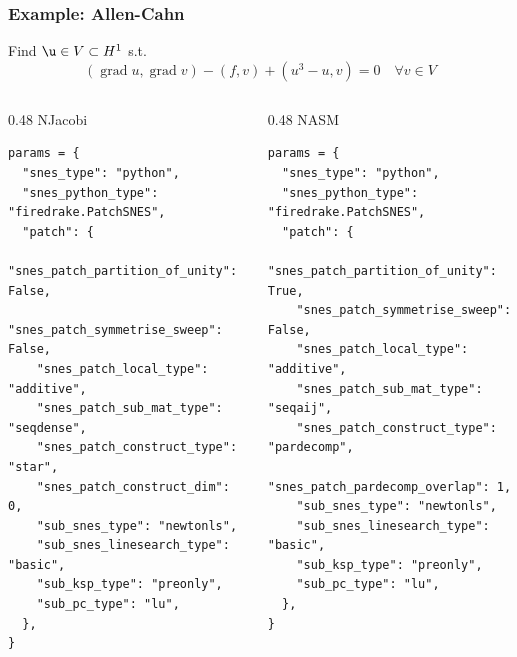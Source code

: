 \documentclass[presentation,aspectratio=43,10pt]{beamer}
\DeclareMathOperator{\grad}{grad}
\begin{document}
\begin{frame}[fragile]
  \frametitle{Example: Allen-Cahn}
  Find $\u \in V \subset H^1$ s.t.
  \begin{equation*}
    (\grad u, \grad v) - (f, v) + (u^3 - u, v) = 0 \quad \forall v
    \in V
  \end{equation*}
  \begin{columns}[T]
    \hspace{0.5em}
    \begin{column}{0.48\pagewidth}
      NJacobi
\begin{verbatim}
params = {
  "snes_type": "python",
  "snes_python_type": "firedrake.PatchSNES",
  "patch": {
    "snes_patch_partition_of_unity": False,
    "snes_patch_symmetrise_sweep": False,
    "snes_patch_local_type": "additive",
    "snes_patch_sub_mat_type": "seqdense",
    "snes_patch_construct_type": "star",
    "snes_patch_construct_dim": 0,
    "sub_snes_type": "newtonls",
    "sub_snes_linesearch_type": "basic",
    "sub_ksp_type": "preonly",
    "sub_pc_type": "lu",
  },
}
\end{verbatim}
    \end{column}
    \hspace{-0.5em}
    \begin{column}{0.48\pagewidth}
      NASM
\begin{verbatim}
params = {
  "snes_type": "python",
  "snes_python_type": "firedrake.PatchSNES",
  "patch": {
    "snes_patch_partition_of_unity": True,
    "snes_patch_symmetrise_sweep": False,
    "snes_patch_local_type": "additive",
    "snes_patch_sub_mat_type": "seqaij",
    "snes_patch_construct_type": "pardecomp",
    "snes_patch_pardecomp_overlap": 1,
    "sub_snes_type": "newtonls",
    "sub_snes_linesearch_type": "basic",
    "sub_ksp_type": "preonly",
    "sub_pc_type": "lu",
  },
}
\end{verbatim}
    \end{column}
  \end{columns}
\end{frame}
\end{document}
